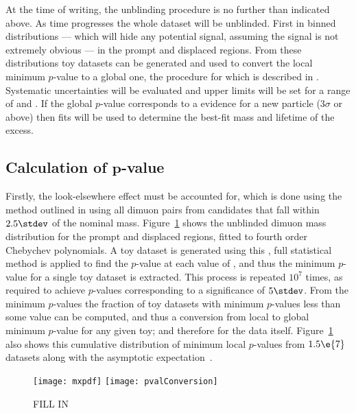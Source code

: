 At the time of writing, the unblinding procedure is no further than indicated above.
As time progresses the whole dataset will be unblinded.
First in binned distributions
--- which will hide any potential signal, assuming the signal is not extremely obvious ---
in the prompt and displaced regions.
From these distributions toy datasets can be generated and used to convert the local minimum
$p$-value to a global one, the procedure for which is described in .
Systematic uncertainties will be evaluated and upper limits will be set for a range of \mass{\db}
and \lifetime{\db}.
If the global $p$-value corresponds to a evidence for a new particle
($3\sigma$ or above) then fits will be used to
determine the best-fit mass and lifetime of the excess.


\subsection[Calculation of $p$-value]
{Calculation of $\boldsymbol{p}$-value}

Firstly, the look-elsewhere effect must be accounted for, which
is done using the method outlined in  using all dimuon pairs from \Bd candidates
that fall within $2.5\stdev$ of the nominal \Bd mass.
Figure~\ref{fig:db:mmumu} shows the unblinded dimuon mass distribution for the prompt and
displaced regions, fitted to fourth order Chebychev polynomials.
A toy dataset is generated using this \PDF, full statistical method is applied to find the
$p$-value at each value of , and thus the minimum $p$-value for a single toy dataset is
extracted.
This process is repeated $10^7$ times, as required to achieve $p$-values corresponding to a
significance of $5\stdev$.
From the minimum $p$-values the fraction of toy datasets with minimum $p$-values less than some
value can be computed, and thus a conversion from local to global minimum $p$-value for any given
toy; and therefore for the data itself.
Figure~\ref{fig:db:mmumu} also shows this cumulative distribution of minimum local $p$-values from
$1.5\e{7}$ datasets along with the asymptotic expectation~\cite{Gross:2010qma}.

\begin{figure}
  \begin{center}
    \texttt{[image: mxpdf]}
    \texttt{[image: pvalConversion]}
    \caption[]
    {
      FILL IN
    }
    \label{fig:db:mmumu}
  \end{center}
\end{figure}


